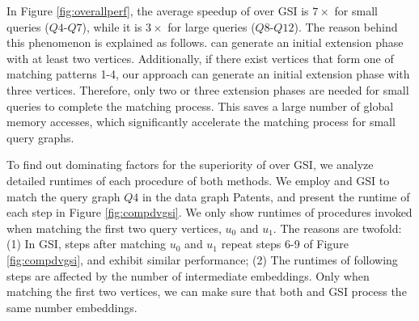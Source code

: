 In Figure \ref{fig:overallperf}, the average speedup of \SystemName over GSI is $7\times$ for small queries ($Q4$-$Q7$), while it is
$3\times$ for large queries ($Q8$-$Q12$). The reason behind this phenomenon is explained as follows. \SystemName can generate an initial
extension phase with at least two vertices. Additionally, if there exist vertices that form one of matching patterns 1-4, our approach can
generate an initial extension phase with three vertices. Therefore, only two or three extension phases are needed for small queries to
complete the matching process. This saves a large number of global memory accesses, which significantly accelerate the matching process for
small query graphs.

To find out dominating factors for the superiority of \SystemName over GSI, we analyze detailed runtimes of each procedure of both methods.
We employ \SystemName and GSI to match the query graph $Q4$ in the data graph Patents, and present the runtime of each step in Figure
\ref{fig:compdvgsi}. We only show runtimes of procedures invoked when matching the first two query vertices, $u_0$ and $u_1$. The reasons
are twofold: (1) In GSI, steps after matching $u_0$ and $u_1$ repeat steps 6-9 of Figure \ref{fig:compdvgsi}, and exhibit similar
performance; (2) The runtimes of following steps are affected by the number of intermediate embeddings. Only when matching the first two
vertices, we can make sure that both \SystemName and GSI process the same number embeddings.

